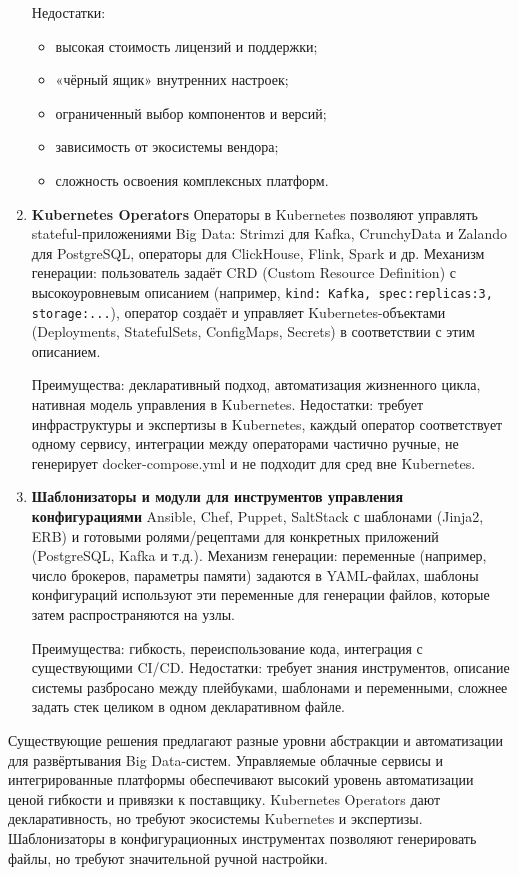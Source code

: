 \begin{enumerate}
	      Недостатки:
	      \begin{itemize}
		      \item высокая стоимость лицензий и поддержки;
		      \item «чёрный ящик» внутренних настроек;
		      \item ограниченный выбор компонентов и версий;
		      \item зависимость от экосистемы вендора;
		      \item сложность освоения комплексных платформ.
	      \end{itemize}
	\item \textbf{Kubernetes Operators}
	      Операторы в Kubernetes позволяют управлять stateful-приложениями Big Data: Strimzi для Kafka, CrunchyData и Zalando для PostgreSQL, операторы для ClickHouse, Flink, Spark и др.
	      Механизм генерации: пользователь задаёт CRD (Custom Resource Definition) с высокоуровневым описанием (например, \texttt{kind: Kafka, spec:{replicas:3, storage:...}}), оператор создаёт и управляет Kubernetes-объектами (Deployments, StatefulSets, ConfigMaps, Secrets) в соответствии с этим описанием.

	      Преимущества: декларативный подход, автоматизация жизненного цикла, нативная модель управления в Kubernetes.
	      Недостатки: требует инфраструктуры и экспертизы в Kubernetes, каждый оператор соответствует одному сервису, интеграции между операторами частично ручные, не генерирует docker-compose.yml и не подходит для сред вне Kubernetes.
	\item \textbf{Шаблонизаторы и модули для инструментов управления конфигурациями}
	      Ansible, Chef, Puppet, SaltStack с шаблонами (Jinja2, ERB) и готовыми ролями/рецептами для конкретных приложений (PostgreSQL, Kafka и т.д.).
	      Механизм генерации: переменные (например, число брокеров, параметры памяти) задаются в YAML-файлах, шаблоны конфигураций используют эти переменные для генерации файлов, которые затем распространяются на узлы.

	      Преимущества: гибкость, переиспользование кода, интеграция с существующими CI/CD.
	      Недостатки: требует знания инструментов, описание системы разбросано между плейбуками, шаблонами и переменными, сложнее задать стек целиком в одном декларативном файле.
\end{enumerate}

Существующие решения предлагают разные уровни абстракции и автоматизации для развёртывания Big Data-систем.
Управляемые облачные сервисы и интегрированные платформы обеспечивают высокий уровень автоматизации ценой гибкости и привязки к поставщику. Kubernetes Operators дают декларативность, но требуют экосистемы Kubernetes и экспертизы. 
Шаблонизаторы в конфигурационных инструментах позволяют генерировать файлы, но требуют значительной ручной настройки. 

